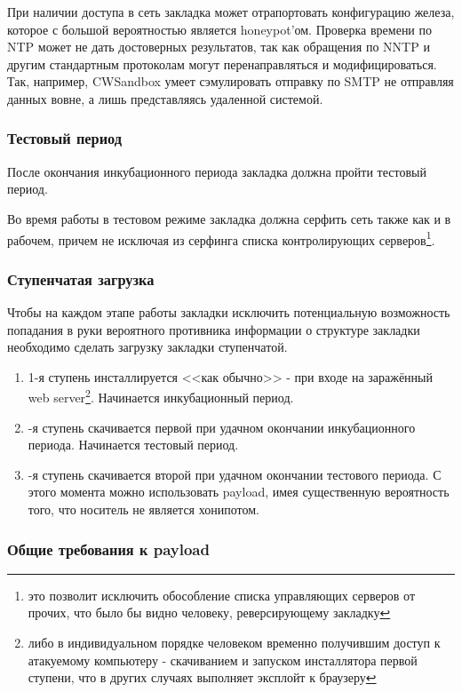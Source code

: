 При наличии доступа в сеть закладка может отрапортовать конфигурацию железа,
которое с большой вероятностью является honeypot'ом. Проверка
времени по NTP может не дать достоверных результатов, так как обращения
по NNTP и другим стандартным протоколам могут перенаправляться и модифицироваться.
 Так,  например, CWSandbox умеет сэмулировать отправку по SMTP
 не отправляя данных вовне, а лишь представляясь удаленной системой.

\subsubsection{Тестовый период}
\label{test_period}

После окончания инкубационного периода закладка должна пройти тестовый
период.

Во время работы в тестовом режиме закладка   должна серфить сеть также
как и в рабочем, причем не исключая из серфинга списка   контролирующих
серверов\footnote{это  позволит исключить обособление списка управляющих
серверов от прочих, что было бы видно человеку, реверсирующему
закладку}.

\subsubsection{Ступенчатая загрузка}

Чтобы на каждом этапе работы закладки исключить потенциальную
возможность попадания в руки  вероятного противника информации о
структуре закладки необходимо сделать загрузку закладки ступенчатой.

\begin{enumerate}
\item{1-я ступень инсталлируется <<как обычно>> - при входе на заражённый
web server\footnote{либо в индивидуальном порядке человеком временно получившим доступ к атакуемому
 компьютеру - скачиванием и запуском инсталлятора первой ступени, что в других случаях выполняет эксплойт
 к браузеру}. Начинается инкубационный период.}
\item{-я ступень скачивается первой при удачном окончании инкубационного периода. Начинается тестовый период.}
\item{-я ступень скачивается второй при удачном окончании тестового периода. С этого момента можно использовать payload, имея существенную вероятность того, что носитель не является хонипотом.}
\end{enumerate}

\subsubsection{Общие требования к payload}

